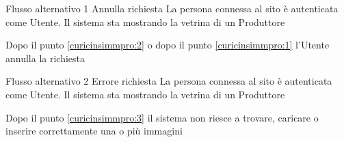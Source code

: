 %
{Flusso alternativo 1}%
{Annulla richiesta}%
{La persona connessa al sito è autenticata come Utente. Il sistema sta mostrando la vetrina di un Produttore}%
{\postNulle}%
{\begin{enumCU}
		\item Dopo il punto \ref{curicinsimmpro:2} o dopo il punto \ref{curicinsimmpro:1} l'Utente annulla la richiesta
	\end{enumCU}}%
%
{Flusso alternativo 2}%
{Errore richiesta}%
{La persona connessa al sito è autenticata come Utente. Il sistema sta mostrando la vetrina di un Produttore}%
{\postNulle}%
{\begin{enumCU}
		\item Dopo il punto \ref{curicinsimmpro:3} il sistema non riesce a trovare, caricare o inserire correttamente una o più immagini
	\end{enumCU}}%


